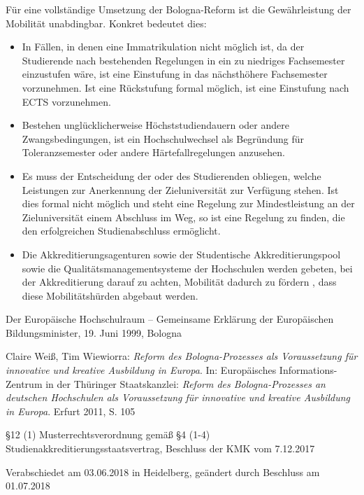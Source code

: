 \documentclass[DIV=calc]{scrartcl}
\begin{document}
Für eine vollständige Umsetzung der Bologna-Reform ist die Gewährleistung der
Mobilität unabdingbar. Konkret bedeutet dies:
\begin{itemize}

\item In Fällen, in denen eine Immatrikulation nicht möglich ist, da der Studierende
  nach bestehenden Regelungen in ein zu niedriges Fachsemester einzustufen wäre,
  ist eine Einstufung in das nächsthöhere Fachsemester vorzunehmen. Ist eine
  Rückstufung formal möglich, ist eine Einstufung nach ECTS vorzunehmen.
\item Bestehen unglücklicherweise Höchststudiendauern oder andere Zwangsbedingungen,
  ist ein Hochschulwechsel als Begründung für Toleranzsemester oder andere
  Härtefallregelungen anzusehen.
\item Es muss der Entscheidung der oder des Studierenden obliegen, welche Leistungen
  zur Anerkennung der Zieluniversität zur Verfügung stehen. Ist dies formal
  nicht möglich und steht eine Regelung zur Mindestleistung an der
  Zieluniversität einem Abschluss im Weg, so ist eine Regelung zu finden, die
  den erfolgreichen Studienabschluss ermöglicht.
\item Die Akkreditierungsagenturen sowie der Studentische Akkreditierungspool sowie die Qualitätsmanagementsysteme der Hochschulen werden
  gebeten, bei der Akkreditierung darauf zu achten, Mobilität dadurch zu
  fördern \cite{mrvo}, dass diese Mobilitätshürden abgebaut werden.
 \end{itemize}
\begin{thebibliography}{9}
 Der Europäische Hochschulraum – Gemeinsame Erklärung der Europäischen Bildungsminister, 19. Juni 1999, Bologna

  Claire Weiß, Tim Wiewiorra: \textit{Reform des Bologna-Prozesses als Voraussetzung
    für innovative und kreative Ausbildung in Europa}. In: Europäisches
    Informations-Zentrum in der Thüringer Staatskanzlei:
    \textit{Reform des Bologna-Prozesses an deutschen Hochschulen als Voraussetzung für
    innovative und kreative Ausbildung in Europa}. Erfurt 2011, S. 105

 §12 (1) Musterrechtsverordnung gemäß §4 (1-4)
  Studienakkreditierungsstaatsvertrag, Beschluss der KMK vom 7.12.2017
\end{thebibliography}
\vfill
    \begin{flushright}
        Verabschiedet am 03.06.2018 in Heidelberg, geändert durch Beschluss am 01.07.2018
    \end{flushright}
\end{document}
